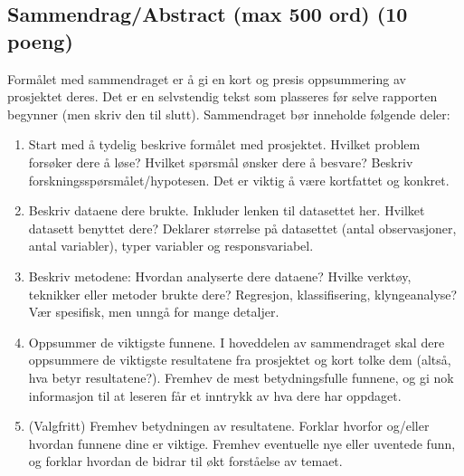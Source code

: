 \subsection{Sammendrag/Abstract (max 500 ord) (10 poeng)}\label{sammendragabstract-max-500-ord-10-poeng}

Formålet med sammendraget er å gi en kort og presis oppsummering av
prosjektet deres. Det er en selvstendig tekst som plasseres før selve
rapporten begynner (men skriv den til slutt). Sammendraget bør inneholde
følgende deler:

\begin{enumerate}
\def\labelenumi{\arabic{enumi}.}
\tightlist
\item
  Start med å tydelig beskrive formålet med prosjektet. Hvilket problem
  forsøker dere å løse? Hvilket spørsmål ønsker dere å besvare? Beskriv
  forskningsspørsmålet/hypotesen. Det er viktig å være kortfattet og
  konkret.
\item
  Beskriv dataene dere brukte. Inkluder lenken til datasettet her.
  Hvilket datasett benyttet dere? Deklarer størrelse på datasettet
  (antal observasjoner, antal variabler), typer variabler og
  responsvariabel.
\item
  Beskriv metodene: Hvordan analyserte dere dataene? Hvilke verktøy,
  teknikker eller metoder brukte dere? Regresjon, klassifisering,
  klyngeanalyse? Vær spesifisk, men unngå for mange detaljer.
\item
  Oppsummer de viktigste funnene. I hoveddelen av sammendraget skal dere
  oppsummere de viktigste resultatene fra prosjektet og kort tolke dem
  (altså, hva betyr resultatene?). Fremhev de mest betydningsfulle
  funnene, og gi nok informasjon til at leseren får et inntrykk av hva
  dere har oppdaget.
\item
  (Valgfritt) Fremhev betydningen av resultatene. Forklar hvorfor
  og/eller hvordan funnene dine er viktige. Fremhev eventuelle nye eller
  uventede funn, og forklar hvordan de bidrar til økt forståelse av
  temaet.
\end{enumerate}
